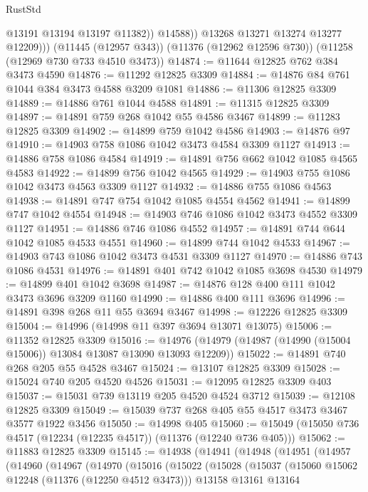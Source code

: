 \begin{lexlean}{RustStd}
\begin{coremodule}
{\begin{coremodule}
{{{{{{{{{{{{{{{{{{{{{{{{{{{{{{{{{{{{{{{{{{{{{{{{{{{{{{{{{{{{{{{{{{{{{{{{{{{{{{{{{{{{{                  @13191
                  @13194
                  @13197
                  @11382))
              @14588))
          @13268
          @13271
          @13274
          @13277
          @12209)))
    (@11445 (@12957 @343))
    (@11376 (@12962 @12596 @730))
    (@11258 (@12969 @730 @733 @4510 @3473))
@14874 := @11644 @12825 @762 @384 @3473 @4590
@14876 := @11292 @12825 @3309
@14884 := @14876 @84 @761 @1044 @384 @3473 @4588 @3209 @1081
@14886 := @11306 @12825 @3309
@14889 := @14886 @761 @1044 @4588
@14891 := @11315 @12825 @3309
@14897 := @14891 @759 @268 @1042 @55 @4586 @3467
@14899 := @11283 @12825 @3309
@14902 := @14899 @759 @1042 @4586
@14903 := @14876 @97
@14910 := @14903 @758 @1086 @1042 @3473 @4584 @3309 @1127
@14913 := @14886 @758 @1086 @4584
@14919 := @14891 @756 @662 @1042 @1085 @4565 @4583
@14922 := @14899 @756 @1042 @4565
@14929 := @14903 @755 @1086 @1042 @3473 @4563 @3309 @1127
@14932 := @14886 @755 @1086 @4563
@14938 := @14891 @747 @754 @1042 @1085 @4554 @4562
@14941 := @14899 @747 @1042 @4554
@14948 := @14903 @746 @1086 @1042 @3473 @4552 @3309 @1127
@14951 := @14886 @746 @1086 @4552
@14957 := @14891 @744 @644 @1042 @1085 @4533 @4551
@14960 := @14899 @744 @1042 @4533
@14967 := @14903 @743 @1086 @1042 @3473 @4531 @3309 @1127
@14970 := @14886 @743 @1086 @4531
@14976 := @14891 @401 @742 @1042 @1085 @3698 @4530
@14979 := @14899 @401 @1042 @3698
@14987 := @14876 @128 @400 @111 @1042 @3473 @3696 @3209 @1160
@14990 := @14886 @400 @111 @3696
@14996 := @14891 @398 @268 @11 @55 @3694 @3467
@14998 := @12226 @12825 @3309
@15004 := @14996 (@14998 @11 @397 @3694 @13071 @13075)
@15006 := @11352 @12825 @3309
@15016 := @14976 (@14979 (@14987 (@14990 (@15004 @15006)) @13084 @13087 @13090 @13093 @12209))
@15022 := @14891 @740 @268 @205 @55 @4528 @3467
@15024 := @13107 @12825 @3309
@15028 := @15024 @740 @205 @4520 @4526
@15031 := @12095 @12825 @3309 @403
@15037 := @15031 @739 @13119 @205 @4520 @4524 @3712
@15039 := @12108 @12825 @3309
@15049 := @15039 @737 @268 @405 @55 @4517 @3473 @3467 @3577 @1922 @3456
@15050 := @14998 @405
@15060 := @15049 (@15050 @736 @4517 (@12234 (@12235 @4517)) (@11376 (@12240 @736 @405)))
@15062 := @11883 @12825 @3309
@15145 := @14938
    (@14941
      (@14948
        (@14951
          (@14957
            (@14960
              (@14967
                (@14970
                  (@15016
                    (@15022
                      (@15028
                        (@15037
                          (@15060 @15062 @12248 (@11376 (@12250 @4512 @3473)))
                          @13158
                          @13161
                          @13164
}}}}}}}}}}}}}}}}}}}}}}}}}}}}}}}}}}}}}}}}}}}}}}}}}}}}}}}}}}}}}}}}}}}}}}}}}}}}}}}}}}}}}
\end{coremodule}}
\end{coremodule}
\end{lexlean}
